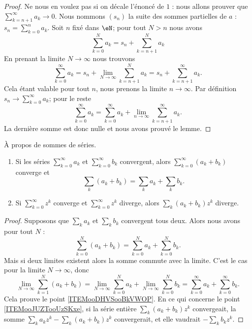 \begin{proof}
	Ne nous en voulez pas si on décale l'énoncé de \( 1\) : nous allons prouver que \( \sum_{k=n+1}^{\infty}a_k\to 0\). Nous nommons \( (s_n)\) la suite des sommes partielles de \( a\) : \( s_n=\sum_{k=0}^na_k\). Soit \( n\) fixé dans \( \eN\); pour tout \( N>n\) nous avons
	\begin{equation}
		\sum_{k=0}^Na_k=s_n+\sum_{k=n+1}^Na_k
	\end{equation}
	En prenant la limite \( N\to \infty\) nous trouvons
	\begin{equation}
		\sum_{k=0}^{\infty}a_k=s_n+\lim_{N\to \infty} \sum_{k=n+1}^Na_k=s_n+\sum_{k=n+1}^{\infty}a_k.
	\end{equation}
	Cela étant valable pour tout \( n\), nous prenons la limite \( n\to\infty\). Par définition \( s_n\to\sum_{k=0}^{\infty}a_k\); pour le reste
	\begin{equation}
		\sum_{k=0}^{\infty}a_k=\sum_{k=0}^{\infty}a_k+\lim_{n\to \infty} \sum_{k=n+1}^{\infty}a_k.
	\end{equation}
	La dernière somme est donc nulle et nous avons prouvé le lemme.
\end{proof}

\begin{proposition}     \label{PROPooUEBWooUQBQvP}
	À propos de sommes de séries.
	\begin{enumerate}
		\item		\label{ITEMooDHVSooBkVWOP}
		      Si les séries \( \sum_{k=0}^{\infty}a_k\) et \( \sum_{k=0}^{\infty}b_k\) convergent, alors \( \sum_{k=0}^{\infty}(a_k+b_k)\) converge et
		      \begin{equation}
			      \sum_k (a_k+b_k) = \sum_k a_k + \sum_k b_k.
		      \end{equation}
		\item	\label{ITEMooJUZTooUzSKxe}
		      Si \( \sum_{k=0}^{\infty}z^k\) converge et \( \sum_{k=0}^{\infty}z^k\) diverge, alors \( \sum_{k}(a_k+b_k)z^k\) diverge.
	\end{enumerate}
\end{proposition}

\begin{proof}
	Supposons que \( \sum_ka_k\) et \( \sum_kb_k\) convergent tous deux. Alors nous avons pour tout \( N\) :
	\begin{equation}
		\sum_{k=0}^N(a_k+b_k)=\sum_{k=0}^Na_k+\sum_{k=0}^Nb_k.
	\end{equation}
	Mais si deux limites existent alors la somme commute avec la limite. C'est le cas pour la limite \( N\to \infty\), donc
	\begin{equation}
		\lim_{N\to \infty} \sum_{k=1}^{N}(a_k+b_k)=\lim_{N\to \infty} \sum_{k=0}^{N}a_k+\lim_{N\to \infty} \sum_{k=0}^{N}b_k=\sum_{k=0}^{\infty}a_k+\sum_{k=0}^{\infty}b_k.
	\end{equation}
	Cela prouve le point \ref{ITEMooDHVSooBkVWOP}. En ce qui concerne le point \ref{ITEMooJUZTooUzSKxe}, si la série entière \( \sum_k(a_k+b_k)z^k\) convergeait, la somme \( \sum_ka_kz^k-\sum_k(a_k+b_k)z^k\) convergerait, et elle vaudrait \( -\sum_kb_kz^k\).
\end{proof}

